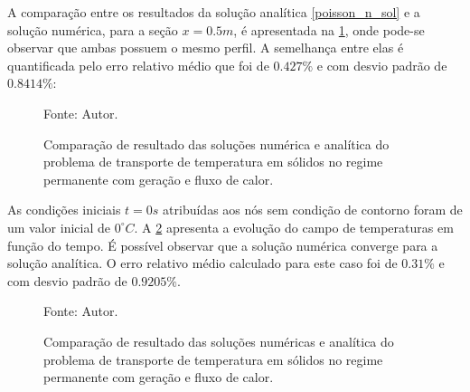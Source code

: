 A comparação entre os resultados da solução analítica \eqref{poisson_n_sol} e a solução numérica, para a seção $x=0.5m$, é apresentada na \ref{poisson_n_perm_comp}, onde pode-se observar que ambas possuem o mesmo perfil.
A semelhança entre elas é quantificada pelo erro relativo médio que foi de $0.427\%$ e com desvio padrão de $0.8414\%$:
\begin{figure}[H]
    \centering
     {\raggedleft \scriptsize Fonte: Autor.}
    \caption{Comparação de resultado das soluções numérica e analítica do problema de transporte de temperatura em sólidos no regime permanente com geração e fluxo de calor.}
    \label{poisson_n_perm_comp}
\end{figure}

As condições iniciais $t=0s$ atribuídas aos nós sem condição de contorno foram de um valor inicial de $0^{\circ}C$.
A \ref{poisson_n_trans_comp} apresenta a evolução do campo de temperaturas em função do tempo.
É possível observar que a solução numérica converge para a solução analítica.
O erro relativo médio calculado para este caso foi de $0.31\%$ e com desvio padrão de $0.9205\%$.
\begin{figure}[H]
    \centering
     {\raggedleft \scriptsize Fonte: Autor.}
    \caption{Comparação de resultado das soluções numéricas e analítica do problema de transporte de temperatura em sólidos no regime permanente com geração e fluxo de calor.}
    \label{poisson_n_trans_comp}
\end{figure}

